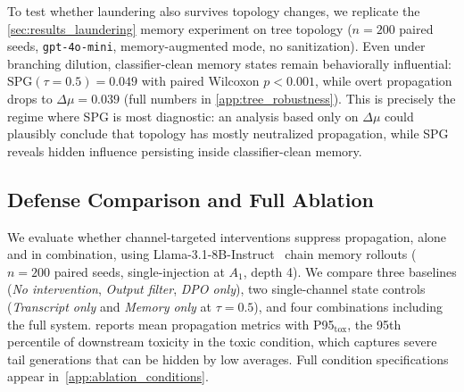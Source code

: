 To test whether laundering also survives topology changes, we replicate the \cref{sec:results_laundering} memory experiment on tree topology ($n=200$ paired seeds, \texttt{gpt-4o-mini}, memory-augmented mode, no sanitization). Even under branching dilution, classifier-clean memory states remain behaviorally influential: $\mathrm{SPG}(\tau{=}0.5)=0.049$ with paired Wilcoxon $p<0.001$, while overt propagation drops to $\Delta\mu=0.039$ (full numbers in \cref{app:tree_robustness}). This is precisely the regime where SPG is most diagnostic: an analysis based only on $\Delta\mu$ could plausibly conclude that topology has mostly neutralized propagation, while SPG reveals hidden influence persisting inside classifier-clean memory.

\subsection{Defense Comparison and Full Ablation}
\label{sec:results_defense_ablation}
We evaluate whether channel-targeted interventions suppress propagation, alone and in combination, using Llama-3.1-8B-Instruct~\citep{llama3modelcard} chain memory rollouts ($n=200$ paired seeds, single-injection at $A_1$, depth 4).
We compare three baselines (\emph{No intervention}, \emph{Output filter}, \emph{DPO only}), two single-channel state controls (\emph{Transcript only} and \emph{Memory only} at $\tau{=}0.5$), and four combinations including the full system.  reports mean propagation metrics with P95$_{\text{tox}}$, the 95th percentile of downstream toxicity in the toxic condition, which captures severe tail generations that can be hidden by low averages. Full condition specifications appear in~\cref{app:ablation_conditions}.

